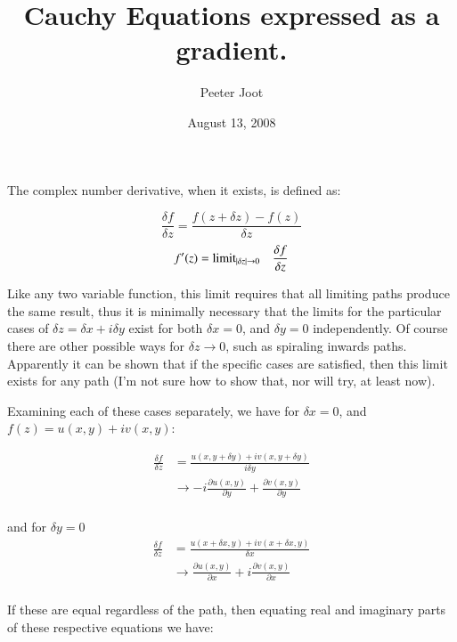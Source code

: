 \documentclass{article}
\title{ Cauchy Equations expressed as a gradient. }
\author{Peeter Joot}
\date{August 13, 2008}
\begin{document}
\maketitle{}

\section{}

The complex number derivative, when it exists, is defined as:

\begin{equation*}
\frac{\delta f}{\delta z} = \frac{ f(z + \delta z) - f(z)}{\delta z}
\end{equation*}
\begin{equation*}
f'(z) = {\text{limit}}_{\lvert{\delta z}\rvert \rightarrow 0} \quad \frac{\delta f}{\delta z}
\end{equation*}

Like any two variable function, this limit requires that all limiting paths produce the same result, thus it is
minimally necessary that the limits for the particular cases of $\delta z = \delta x + i \delta y$ exist for both
$\delta x = 0$, and $\delta y = 0$ independently.  Of course there are other possible ways for $\delta z \rightarrow 0$, such as spiraling inwards paths.  Apparently it can be shown that if the specific cases are satisfied, then this limit exists for any path (I'm not sure how to show that, nor will try, at least now).

Examining each of these cases separately, we have for $\delta x = 0$, and $f(z) = u(x,y) + i v(x,y)$:

\begin{align*}
\frac{\delta f}{\delta z}
&= \frac{u(x,y + \delta y) + i v(x,y + \delta y)}{i\delta y} \\
&\rightarrow -i \frac{\partial u(x,y)}{\partial y} + \frac{\partial v(x,y)}{\partial y} \\
\end{align*}

and for $\delta y = 0$
\begin{align*}
\frac{\delta f}{\delta z}
&= \frac{u(x + \delta x,y) + i v(x + \delta x, y)}{\delta x} \\
&\rightarrow \frac{\partial u(x,y)}{\partial x} + i\frac{\partial v(x,y)}{\partial x} \\
\end{align*}

If these are equal regardless of the path, then equating real and imaginary parts of these respective equations we have:
\end{document}
